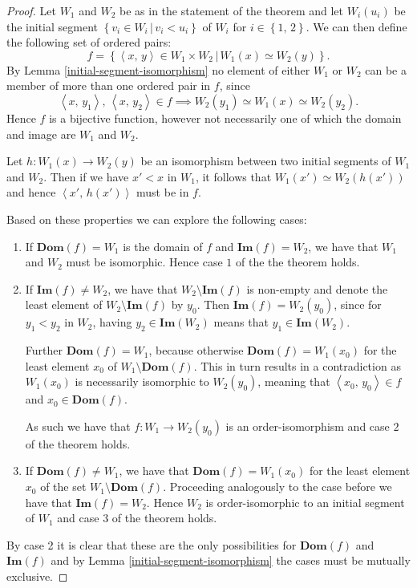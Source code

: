 \documentclass[../../main.tex]{subfiles}
\begin{document}
\begin{proof}
    Let $W_1$ and $W_2$ be as in the statement of the theorem and let $W_i(u_i)$ be the initial segment $\left\{v_i \in W_i \,\vert\, v_i < u_i\right\}$ of $W_i$ for $i \in \left\{1,\, 2\right\}$.
    We can then define the following set of ordered pairs:
    $$f = \left\{\left<x,\, y\right> \in W_1 \times W_2 \,\vert\, W_1(x) \simeq W_2(y)\right\}.$$
    By Lemma \ref{initial-segment-isomorphism} no element of either $W_1$ or $W_2$ can be a member of more than one ordered pair in $f$,
    since $$\left<x,\, y_1\right>,\, \left<x,\, y_2\right> \in f \implies W_2(y_1) \simeq W_1(x) \simeq W_2(y_2).$$
    Hence $f$ is a bijective function, however not necessarily one of which the domain and image are $W_1$ and $W_2$.
    
    Let $h: W_1(x) \to W_2(y)$ be an isomorphism between two initial segments of $W_1$ and $W_2$.
    Then if we have $x' < x$ in $W_1$, it follows that $W_1(x') \simeq W_2(h(x'))$ and hence $\left<x',\, h(x')\right>$ must be in $f$.

    Based on these properties we can explore the following cases:
    \begin{enumerate}
        \item If $\mathbf{Dom}(f) = W_1$ is the domain of $f$ and $\mathbf{Im}(f) = W_2$, we have that $W_1$ and $W_2$ must be isomorphic.
        Hence case $1$ of the the theorem holds.
        \item If $\mathbf{Im}(f) \neq W_2$, we have that $W_2 \setminus \mathbf{Im}(f)$ is non-empty and denote the least element of $W_2 \setminus \mathbf{Im}(f)$ by $y_0$.
        Then $\mathbf{Im}(f) = W_2(y_0)$, since for $y_1 < y_2$ in $W_2$, having $y_2 \in \mathbf{Im}(W_2)$ means that $y_1 \in \mathbf{Im}(W_2)$.

        Further $\mathbf{Dom}(f) = W_1$, because otherwise $\mathbf{Dom}(f) = W_1(x_0)$ for the least element $x_0$ of $W_1 \setminus \mathbf{Dom}(f)$.
        This in turn results in a contradiction as $W_1(x_0)$ is necessarily isomorphic to $W_2(y_0)$, meaning that $\left<x_0,\, y_0\right> \in f$ and $x_0 \in \mathbf{Dom}(f)$.

        As such we have that $f: W_1 \to W_2(y_0)$ is an order-isomorphism and case $2$ of the theorem holds.
        \item If $\mathbf{Dom}(f) \neq W_1$, we have that $\mathbf{Dom}(f) = W_1(x_0)$ for the least element $x_0$ of the set $W_1 \setminus \mathbf{Dom}(f)$.
        Proceeding analogously to the case before we have that $\mathbf{Im}(f) = W_2$. 
        Hence $W_2$ is order-isomorphic to an initial segment of $W_1$ and case $3$ of the theorem holds.
    \end{enumerate}
    By case 2 it is clear that these are the only possibilities for $\mathbf{Dom}(f)$ and $\mathbf{Im}(f)$ and by Lemma \ref{initial-segment-isomorphism} the cases must be mutually exclusive.
\end{proof}
\end{document}
